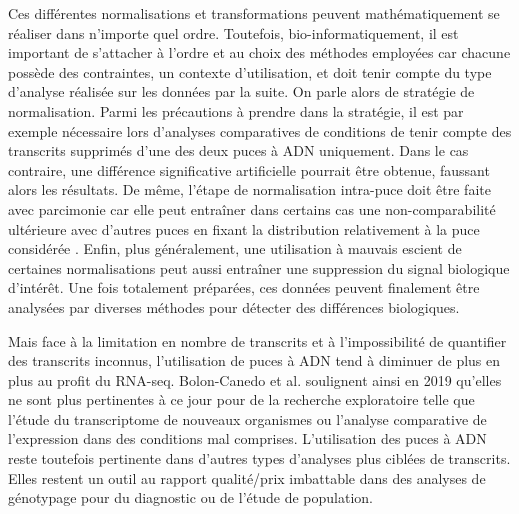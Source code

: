 Ces différentes normalisations et transformations peuvent mathématiquement se réaliser dans n'importe quel ordre. Toutefois, bio-informatiquement, il est important de s'attacher à l'ordre et au choix des méthodes employées car chacune possède des contraintes, un contexte d'utilisation, et doit tenir compte du type d'analyse réalisée sur les données par la suite. On parle alors de stratégie de normalisation. Parmi les précautions à prendre dans la stratégie, il est par exemple nécessaire lors d'analyses comparatives de conditions de tenir compte des transcrits supprimés d'une des deux puces à ADN uniquement. Dans le cas contraire, une différence significative artificielle pourrait être obtenue, faussant alors les résultats. De même, l'étape de normalisation intra-puce doit être faite avec parcimonie car elle peut entraîner dans certains cas une non-comparabilité ultérieure avec d'autres puces en fixant la distribution relativement à la puce considérée \cite{Argyropoulos2006Apr}. Enfin, plus généralement, une utilisation à mauvais escient de certaines normalisations peut aussi entraîner une suppression du signal biologique d'intérêt. Une fois totalement préparées, ces données peuvent finalement être analysées par diverses méthodes pour détecter des différences biologiques.



Mais face à la limitation en nombre de transcrits et à l'impossibilité de quantifier des transcrits inconnus, l'utilisation de puces à ADN tend à diminuer de plus en plus au profit du RNA-seq. Bolon-Canedo et al. soulignent ainsi en 2019 \cite{Bolon-Canedo2019} qu'elles ne sont plus pertinentes à ce jour pour de la recherche exploratoire telle que l'étude du transcriptome de nouveaux organismes ou l'analyse comparative de l'expression dans des conditions mal comprises.
L'utilisation des puces à ADN reste toutefois pertinente dans d'autres types d'analyses plus ciblées de transcrits. Elles restent un outil au rapport qualité/prix imbattable dans des analyses de génotypage pour du diagnostic ou de l'étude de population.



